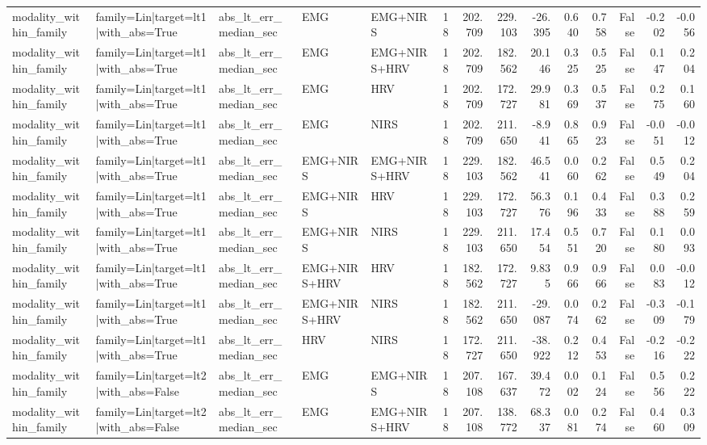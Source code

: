 \begin{table}
\begin{tabular}{lllllrrrrrrrrr}
modality_within_family & family=Lin|target=lt1|with_abs=True & abs_lt_err_median_sec & EMG & EMG+NIRS & 18 & 202.709 & 229.103 & -26.395 & 0.640 & 0.758 & False & -0.202 & -0.056 \\
modality_within_family & family=Lin|target=lt1|with_abs=True & abs_lt_err_median_sec & EMG & EMG+NIRS+HRV & 18 & 202.709 & 182.562 & 20.146 & 0.325 & 0.525 & False & 0.147 & 0.204 \\
modality_within_family & family=Lin|target=lt1|with_abs=True & abs_lt_err_median_sec & EMG & HRV & 18 & 202.709 & 172.727 & 29.981 & 0.369 & 0.537 & False & 0.275 & 0.160 \\
modality_within_family & family=Lin|target=lt1|with_abs=True & abs_lt_err_median_sec & EMG & NIRS & 18 & 202.709 & 211.650 & -8.941 & 0.865 & 0.923 & False & -0.051 & -0.012 \\
modality_within_family & family=Lin|target=lt1|with_abs=True & abs_lt_err_median_sec & EMG+NIRS & EMG+NIRS+HRV & 18 & 229.103 & 182.562 & 46.541 & 0.060 & 0.262 & False & 0.549 & 0.204 \\
modality_within_family & family=Lin|target=lt1|with_abs=True & abs_lt_err_median_sec & EMG+NIRS & HRV & 18 & 229.103 & 172.727 & 56.376 & 0.196 & 0.433 & False & 0.388 & 0.259 \\
modality_within_family & family=Lin|target=lt1|with_abs=True & abs_lt_err_median_sec & EMG+NIRS & NIRS & 18 & 229.103 & 211.650 & 17.454 & 0.551 & 0.720 & False & 0.180 & 0.093 \\
modality_within_family & family=Lin|target=lt1|with_abs=True & abs_lt_err_median_sec & EMG+NIRS+HRV & HRV & 18 & 182.562 & 172.727 & 9.835 & 0.966 & 0.966 & False & 0.083 & -0.012 \\
modality_within_family & family=Lin|target=lt1|with_abs=True & abs_lt_err_median_sec & EMG+NIRS+HRV & NIRS & 18 & 182.562 & 211.650 & -29.087 & 0.074 & 0.262 & False & -0.309 & -0.179 \\
modality_within_family & family=Lin|target=lt1|with_abs=True & abs_lt_err_median_sec & HRV & NIRS & 18 & 172.727 & 211.650 & -38.922 & 0.212 & 0.453 & False & -0.216 & -0.222 \\
modality_within_family & family=Lin|target=lt2|with_abs=False & abs_lt_err_median_sec & EMG & EMG+NIRS & 18 & 207.108 & 167.637 & 39.472 & 0.002 & 0.124 & False & 0.556 & 0.222 \\
modality_within_family & family=Lin|target=lt2|with_abs=False & abs_lt_err_median_sec & EMG & EMG+NIRS+HRV & 18 & 207.108 & 138.772 & 68.337 & 0.081 & 0.274 & False & 0.460 & 0.309 \\

\end{tabular}
\end{table}
